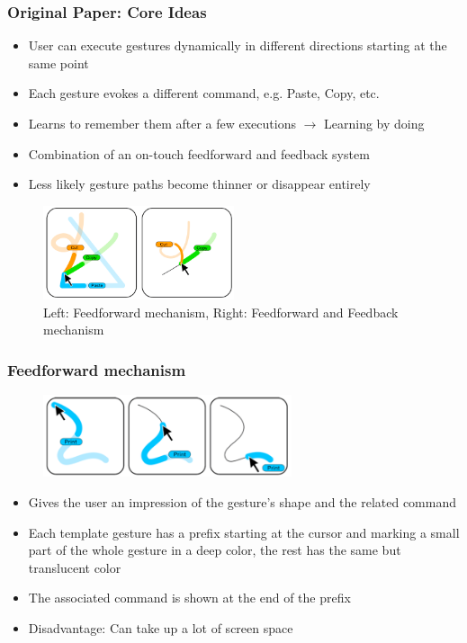 \documentclass{beamer}
\begin{document}
\begin{frame}
\frametitle{Original Paper: Core Ideas}

\begin{itemize}
\item User can execute gestures dynamically in different directions starting at the same point
\pause
\item Each gesture evokes a different command, e.g. Paste, Copy, etc.
\pause
\item Learns to remember them after a few executions $\rightarrow$ \grqq Learning by doing\grqq
\pause
\item Combination of an on-touch feedforward and feedback system
\pause
\item Less likely gesture paths become thinner or disappear entirely
\pause
\end{itemize}

\begin{figure}[H]
\centering
\includegraphics[width=0.5\textwidth]{ffpaths12.png}
	\caption{Left: Feedforward mechanism, Right: Feedforward and Feedback mechanism}
\end{figure}





\end{frame}

\begin{frame}
\frametitle{Feedforward mechanism}

\begin{figure}[H]
\centering
\includegraphics[width=0.65\textwidth]{ff.png}
\end{figure}

\begin{itemize}
\item Gives the user an impression of the gesture's shape and the related command
\pause
\item Each template gesture has a prefix starting at the cursor and marking a small part of the whole gesture in a deep color, the rest has the same but translucent color
\pause
\item The associated command is shown at the end of the prefix
\pause
\item Disadvantage: Can take up a lot of screen space
\end{itemize}


\end{frame}
\end{document}
